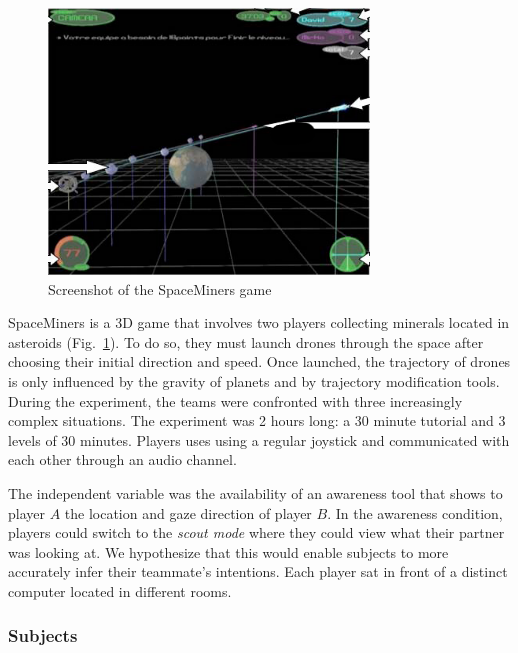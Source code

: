\documentclass[natbib]{svjour3}
\begin{document}
\begin{figure}
        \centering
        \includegraphics[width=\textwidth]{image4.png}
        \caption{Screenshot of the {\sc SpaceMiners} game}
        \label{study1:spaceminer}
\end{figure}


{\sc SpaceMiners} is a 3D game that involves two players collecting minerals
located in asteroids (Fig.~\ref{study1:spaceminer}). To do so, they must launch
drones through the space after choosing their initial direction and speed. Once
launched, the trajectory of drones is only influenced by the gravity of planets
and by trajectory modification tools.  During the experiment, the teams were
confronted with three increasingly complex situations. The experiment was 2
hours long: a 30 minute tutorial and 3 levels of 30 minutes. Players uses using
a regular joystick and communicated with each other through an audio channel.

The independent variable was the availability of an awareness tool that shows to
player $A$  the location and gaze direction of player $B$. In the awareness
condition, players could switch to the \emph{scout mode} where they could view
what their partner was looking at. We hypothesize that this would enable
subjects to more accurately infer their teammate's intentions. Each player sat
in front of a distinct computer located in different rooms. 

\subsubsection*{Subjects}
\end{document}

